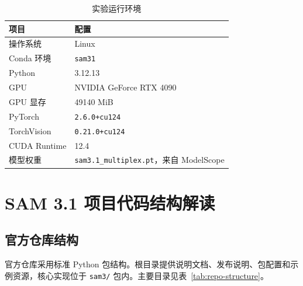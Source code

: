 \documentclass[UTF8,a4paper,zihao=-4,fontset=none]{ctexart}
\begin{document}
\begin{table}[H]
  \centering
  \small
  \caption{实验运行环境}
  \label{tab:env}
  \begin{tabular}{L{4.2cm}L{8.2cm}}
    \toprule
    项目 & 配置 \\
    \midrule
    操作系统 & Linux \\
    Conda 环境 & \texttt{sam31} \\
    Python & 3.12.13 \\
    GPU & NVIDIA GeForce RTX 4090 \\
    GPU 显存 & 49140 MiB \\
    PyTorch & \texttt{2.6.0+cu124} \\
    TorchVision & \texttt{0.21.0+cu124} \\
    CUDA Runtime & 12.4 \\
    模型权重 & \texttt{sam3.1\_multiplex.pt}，来自 ModelScope\cite{modelscope_sam31} \\
    \bottomrule
  \end{tabular}
\end{table}

\section{SAM 3.1 项目代码结构解读}

\subsection{官方仓库结构}

官方仓库采用标准 Python 包结构。根目录提供说明文档、发布说明、包配置和示例资源，核心实现位于 \texttt{sam3/} 包内。主要目录见表~\ref{tab:repo-structure}。
\end{document}

